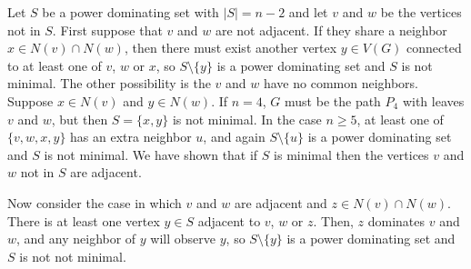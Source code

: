 \documentclass{article}
\numberwithin{figure}{section}   %
\theoremstyle{definition}
\theoremstyle{definition}
\theoremstyle{definition}
\newcommand{\ol}{\overline}
\newcommand{\pd}{\gamma_P}
\newcommand{\pdbar}{\ol\pd}
\begin{document}
Let $S$ be a power dominating set with $|S|=n-2$ and let $v$ and $w$ be the vertices not in $S$. First suppose that $v$ and $w$ are not adjacent. If they share a neighbor $x \in N(v)\cap N(w)$, then there must exist another vertex $y \in V(G)$ connected to at least one of $v$, $w$ or $x$, so $S\setminus\{y\}$ is a power dominating set and $S$ is not minimal.  The other possibility is the $v$ and $w$ have no common neighbors. Suppose $x \in N(v)$ and $y \in N(w)$. If $n=4$, $G$ must be the path $P_4$ with leaves $v$ and $w$, but then $S=\{x,y\}$ is not minimal. In the case $n\geq5$, at least one of $\{v,w,x,y\}$ has an extra neighbor $u$, and again $S\setminus\{u\}$  is a power dominating set and $S$ is not minimal.  We have shown that if $S$ is minimal then  the vertices $v$ and $w$ not in $S$ are adjacent.


Now consider the case in which  $v$ and $w$ are adjacent and $z \in N(v) \cap N(w)$. There is at least one vertex $y \in S$ adjacent to $v$, $w$ or $z$. Then, $z$ dominates $v$ and $w$, and any neighbor of $y$ will observe $y$, so $S\setminus\{y\}$ is a  power dominating set and  $S$ is not not minimal. 
\end{document}
